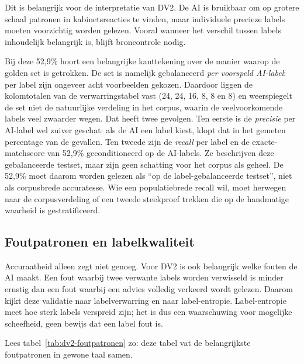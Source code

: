 Dit is belangrijk voor de interpretatie van DV2. De AI is bruikbaar om op grotere schaal patronen in kabinetsreacties te vinden, maar individuele precieze labels moeten voorzichtig worden gelezen. Vooral wanneer het verschil tussen labels inhoudelijk belangrijk is, blijft broncontrole nodig.

Bij deze 52,9\% hoort een belangrijke kanttekening over de manier waarop de golden set is getrokken. De set is namelijk gebalanceerd \emph{per voorspeld AI-label}: per label zijn ongeveer acht voorbeelden gekozen. Daardoor liggen de kolomtotalen van de verwarringstabel vast (24, 24, 16, 8, 8 en 8) en weerspiegelt de set niet de natuurlijke verdeling in het corpus, waarin de veelvoorkomende labels veel zwaarder wegen. Dat heeft twee gevolgen. Ten eerste is de \emph{precisie} per AI-label wel zuiver geschat: als de AI een label kiest, klopt dat in het gemeten percentage van de gevallen. Ten tweede zijn de \emph{recall} per label en de exacte-matchscore van 52,9\% geconditioneerd op de AI-labels. Ze beschrijven deze gebalanceerde testset, maar zijn geen schatting voor het corpus als geheel. De 52,9\% moet daarom worden gelezen als ``op de label-gebalanceerde testset'', niet als corpusbrede accuratesse. Wie een populatiebrede recall wil, moet herwegen naar de corpusverdeling of een tweede steekproef trekken die op de handmatige waarheid is gestratificeerd.

\subsection{Foutpatronen en labelkwaliteit}
\label{subsec:dv2-foutpatronen-labelkwaliteit}

Accuraatheid alleen zegt niet genoeg. Voor DV2 is ook belangrijk welke fouten de AI maakt. Een fout waarbij twee verwante labels worden verwisseld is minder ernstig dan een fout waarbij een advies volledig verkeerd wordt gelezen. Daarom kijkt deze validatie naar labelverwarring en naar label-entropie. Label-entropie meet hoe sterk labels verspreid zijn; het is dus een waarschuwing voor mogelijke scheefheid, geen bewijs dat een label fout is.

Lees tabel~\ref{tab:dv2-foutpatronen} zo: deze tabel vat de belangrijkste foutpatronen in gewone taal samen.

